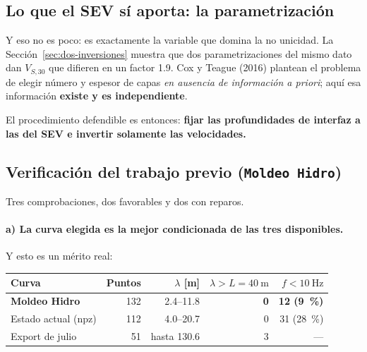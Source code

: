 
\subsection{Lo que el SEV s\'i aporta: la parametrizaci\'on}

Y eso no es poco: es exactamente la variable que domina la no unicidad.
La Secci\'on~\ref{sec:dos-inversiones} muestra que dos parametrizaciones del
mismo dato dan $V_{S,30}$ que difieren en un factor \num{1.9}. Cox y
Teague (2016) plantean el problema de elegir n\'umero y espesor de capas
\emph{en ausencia de informaci\'on a priori}; aqu\'i esa informaci\'on
\textbf{existe y es independiente}.

El procedimiento defendible es entonces: \textbf{fijar las profundidades de
interfaz a las del SEV e invertir solamente las velocidades.}

\subsection{Verificaci\'on del trabajo previo (\texttt{Moldeo Hidro})}

Tres comprobaciones, dos favorables y dos con reparos.

\paragraph{a) La curva elegida es la mejor condicionada de las tres disponibles.}
Y esto es un m\'erito real:

\begin{center}\footnotesize
\begin{tabular}{@{}lrrrr@{}}
\toprule
Curva & Puntos & $\lambda$ [\si{\meter}] & $\lambda>L=\SI{40}{\meter}$ & $f<\SI{10}{\hertz}$ \\
\midrule
\textbf{Moldeo Hidro} & 132 & \SIrange{2.4}{11.8}{} & \textbf{0} & \textbf{12 (\SI{9}{\percent})} \\
Estado actual (npz) & 112 & \SIrange{4.0}{20.7}{} & 0 & 31 (\SI{28}{\percent}) \\
Export de julio & 51 & hasta \num{130.6} & 3 & --- \\
\bottomrule
\end{tabular}
\end{center}

